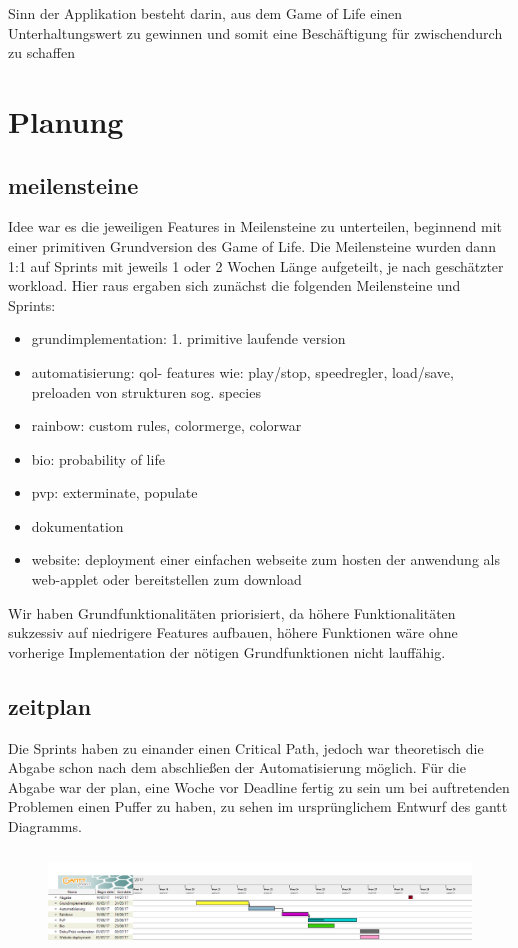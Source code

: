 \documentclass[12pt]{article}
\theoremstyle{plain}
\begin{document}
Sinn der Applikation besteht darin, aus dem Game of Life einen Unterhaltungswert zu gewinnen und somit eine Beschäftigung für zwischendurch zu schaffen

\section{Planung}

\subsection{meilensteine}
Idee war es die jeweiligen Features in Meilensteine zu unterteilen, beginnend mit einer primitiven Grundversion des Game of Life. Die Meilensteine wurden dann 1:1 auf Sprints mit jeweils 1 oder 2 Wochen Länge aufgeteilt, je nach geschätzter workload.  Hier raus ergaben sich zunächst die folgenden Meilensteine und Sprints:
\begin{itemize}
\item
grundimplementation: 1. primitive laufende version
\item
automatisierung: qol- features wie: play/stop, speedregler, load/save, preloaden von strukturen sog. species
\item
rainbow: custom rules, colormerge, colorwar
\item
bio: probability of life
\item
pvp: exterminate, populate
\item
dokumentation
\item
website: deployment einer einfachen webseite zum hosten der anwendung als web-applet oder bereitstellen zum download
\end{itemize}

Wir haben Grundfunktionalitäten priorisiert, da höhere Funktionalitäten sukzessiv auf niedrigere Features aufbauen,
höhere Funktionen wäre ohne vorherige Implementation der nötigen Grundfunktionen nicht lauffähig.

\subsection{zeitplan}
Die Sprints haben zu einander einen Critical Path, jedoch war theoretisch die Abgabe schon nach dem abschließen der Automatisierung möglich.
Für die Abgabe war der plan, eine Woche vor Deadline fertig zu sein um bei auftretenden Problemen einen Puffer zu haben, zu sehen im ursprünglichem Entwurf des gantt Diagramms.
\begin{figure}[ht]
\centering
\includegraphics[width=1\textwidth, height=100px]{images/ganttdep.png}
\end{figure}
\end{document}
